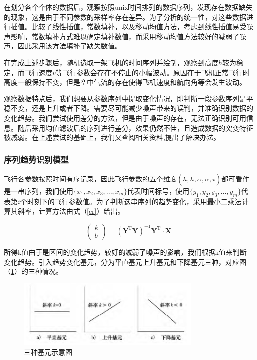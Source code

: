 \documentclass{my_paper}
\begin{document}
在划分各个个体的数据后，观察按照unix时间排列的数据序列，发现存在数据缺失的现象，这是由于不同参数的采样率存在差异。为了分析的统一性，对这些数据进行插值。比较了线性插值，常数填补，以及移动均值方法，考虑到线性插值易受噪声影响，常数填补方式难以确定填补数值，而采用移动均值方法较好的减弱了噪声，因此采用该方法填补了缺失数值。

在完成上述步骤后，随机选取一架飞机的时间序列并绘制，观察到高度$h$较为稳定，而飞行速度$v$等飞行参数会存在不停止的小幅波动。原因在于飞机正常飞行时高度一般保持不变，但是空中气流的存在使得飞机速度和航向角等会发生波动。

观察数据特点后，我们想要从参数序列中提取变化情况，即判断一段参数序列是平稳不变，还是上升或者下降。需要尽可能减少噪声带来的误判，并准确识别数据的变化趋势。我们尝试使用差分的方法，但是由于噪声的存在，无法正确识别可用信息。随后采用均值滤波后的序列进行差分，效果仍然不佳，且造成数据的突变特征被减弱。在上述尝试的基础上，我们又查阅相关资料\cite{9},提出了解决办法。

\subsubsection{序列趋势识别模型}

飞行各参数按照时间有序记录，因此飞行参数的五个维度$(h,\dot{h},\alpha,\dot{\alpha},v )$都可看作是一串序列，我们使用$\{x_1,x_2,x_3,...,x_m\}$代表时间标号，使用$\{y_1,y_2,y_3,...,y_m\}$代表第$i$个时刻下的飞行参数值。为了判断这串序列的趋势变化，采用最小二乘法计算其斜率，计算方法由式（\ref{er}）给出。

\begin{equation}
    \left(\begin{array}{l}k \\b\end{array}\right)=\left(\boldsymbol{Y}^{\mathrm{T}} \boldsymbol{Y}\right)^{-1} \boldsymbol{Y}^{\mathrm{T}} \cdot \boldsymbol{X}
\label{er}
\end{equation}

所得k值由于是区间的变化趋势，较好的减弱了噪声的影响，我们根据k值来判断变化趋势。引入趋势变化基元，分为平直基元上升基元和下降基元三种，对应图（\ref{jiyuan}）的三种情况。

\begin {figure}[h]
\centering %
\includegraphics[width=0.8\textwidth]{jiyuan.png}
\caption{三种基元示意图} %
\label{jiyuan}
\end {figure}
\end{document}

